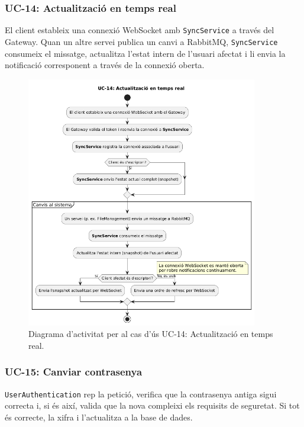 \subsubsection{UC-14: Actualització en temps real}
El client estableix una connexió WebSocket amb \texttt{SyncService} a través del Gateway. Quan un altre servei publica un canvi a RabbitMQ, \texttt{SyncService} consumeix el missatge, actualitza l'estat intern de l'usuari afectat i li envia la notificació corresponent a través de la connexió oberta.

\begin{figure}[H]
    \centering
    \includegraphics[width=0.9\textwidth]{Figures/ad_UC14.png}
    \caption{Diagrama d'activitat per al cas d'ús UC-14: Actualització en temps real.}
    \label{fig:ad_uc14_app}
\end{figure}

\subsubsection{UC-15: Canviar contrasenya}
\texttt{UserAuthentication} rep la petició, verifica que la contrasenya antiga sigui correcta i, si és així, valida que la nova compleixi els requisits de seguretat. Si tot és correcte, la xifra i l'actualitza a la base de dades.

